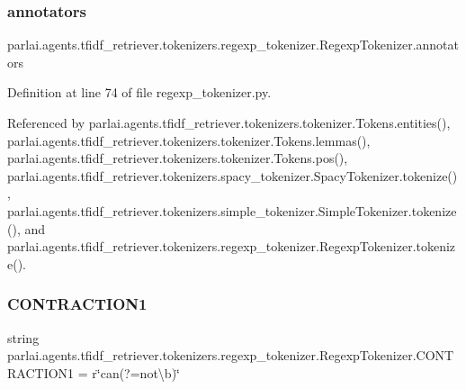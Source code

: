 \subsubsection{\texorpdfstring{annotators}{annotators}}
{\footnotesize\ttfamily parlai.\+agents.\+tfidf\+\_\+retriever.\+tokenizers.\+regexp\+\_\+tokenizer.\+Regexp\+Tokenizer.\+annotators}



Definition at line 74 of file regexp\+\_\+tokenizer.\+py.



Referenced by parlai.\+agents.\+tfidf\+\_\+retriever.\+tokenizers.\+tokenizer.\+Tokens.\+entities(), parlai.\+agents.\+tfidf\+\_\+retriever.\+tokenizers.\+tokenizer.\+Tokens.\+lemmas(), parlai.\+agents.\+tfidf\+\_\+retriever.\+tokenizers.\+tokenizer.\+Tokens.\+pos(), parlai.\+agents.\+tfidf\+\_\+retriever.\+tokenizers.\+spacy\+\_\+tokenizer.\+Spacy\+Tokenizer.\+tokenize(), parlai.\+agents.\+tfidf\+\_\+retriever.\+tokenizers.\+simple\+\_\+tokenizer.\+Simple\+Tokenizer.\+tokenize(), and parlai.\+agents.\+tfidf\+\_\+retriever.\+tokenizers.\+regexp\+\_\+tokenizer.\+Regexp\+Tokenizer.\+tokenize().

\mbox{\label{classparlai_1_1agents_1_1tfidf__retriever_1_1tokenizers_1_1regexp__tokenizer_1_1RegexpTokenizer_abe3ce02620f3abd53bccaf69ba173c96}} 
\subsubsection{\texorpdfstring{C\+O\+N\+T\+R\+A\+C\+T\+I\+O\+N1}{CONTRACTION1}}
{\footnotesize\ttfamily string parlai.\+agents.\+tfidf\+\_\+retriever.\+tokenizers.\+regexp\+\_\+tokenizer.\+Regexp\+Tokenizer.\+C\+O\+N\+T\+R\+A\+C\+T\+I\+O\+N1 = r\char`\"{}can(?=not\textbackslash{}b)\char`\"{}\hspace{0.3cm}{\ttfamily [static]}}



